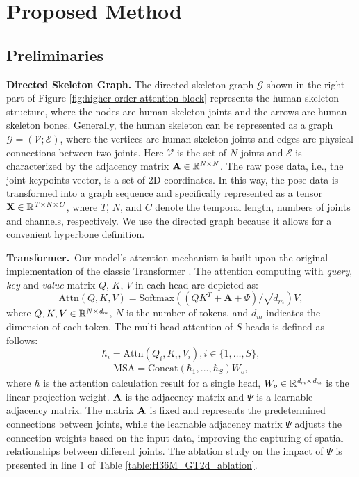 \documentclass{article}
\begin{document}
\section{Proposed Method}
\subsection{Preliminaries}
\noindent \textbf{Directed Skeleton Graph.} The directed skeleton graph $\mathcal{G}$ shown in the right part of Figure \ref{fig:higher order attention block} represents the human skeleton structure, where the nodes are human skeleton joints and the arrows are human skeleton bones. Generally, the human skeleton can be represented as a graph $\mathcal{G} = (\mathcal{V}; \mathcal{E})$, where the vertices are human skeleton joints and edges are physical connections between two joints. Here $\mathcal{V}$ is the set of $N$ joints and $\mathcal{E}$ is characterized by the adjacency matrix $ \bf{A} \in \mathbb{R}^{\it{N \times N}}$. 
The raw pose data, i.e., the joint keypoints vector, is a set of 2D coordinates. In this way, the pose data is transformed into a graph sequence and specifically represented as a tensor $ \bf{X} \in \mathbb{R}^{\it{T \times N \times C}}$, where $T$, $N$, and $C$ denote the temporal length, numbers of joints and channels, respectively. We use the directed graph because it allows for a convenient hyperbone definition.


\noindent \textbf{Transformer.}~Our model's attention mechanism is built upon the original implementation of the classic Transformer \cite{vaswani2017attention}. The attention computing with \textit{query}, \textit{key} and \textit{value} matrix $Q$, $K$, $V$ in each head are depicted as:
\begin{equation}
    \text{Attn}(Q,K,V) = \text{Softmax}((QK^T + \textbf{A} + \Psi) /\sqrt{d_m})V,
    \label{eq:attn}
\end{equation}
where ${Q,K,V} \in \mathbb{R}^{\it{N \times d_m}}$, $N$ is the number of tokens, and $d_m$ indicates the dimension of each token. The multi-head attention of $S$ heads is defined as follows:
\begin{equation}
    \hbar_i = \text{Attn}(Q_i,K_i,V_i), \textit{i} \in \{\textit{1},\dots,\textit{S}\},
\end{equation}
\begin{eqnarray}
    \text{MSA} = \text{Concat}(\hbar_1, ..., \hbar_S)W_o,
    \label{eq:MHSA_concat}
\end{eqnarray}
where $\hbar$ is the attention calculation result for a single head, $ W_o \in \mathbb{R}^{\it{d_m \times d_m}}$ is the linear projection weight. $\bf{A}$ is the adjacency matrix and $\Psi$ is a learnable adjacency matrix. The matrix $\bf{A}$ is fixed and represents the predetermined connections between joints, while the learnable adjacency matrix $\Psi$ adjusts the connection weights based on the input data, improving the capturing of spatial relationships between different joints. The ablation study on the impact of $\Psi$ is presented in line 1 of Table \ref{table:H36M_GT2d_ablation}.
\end{document}
